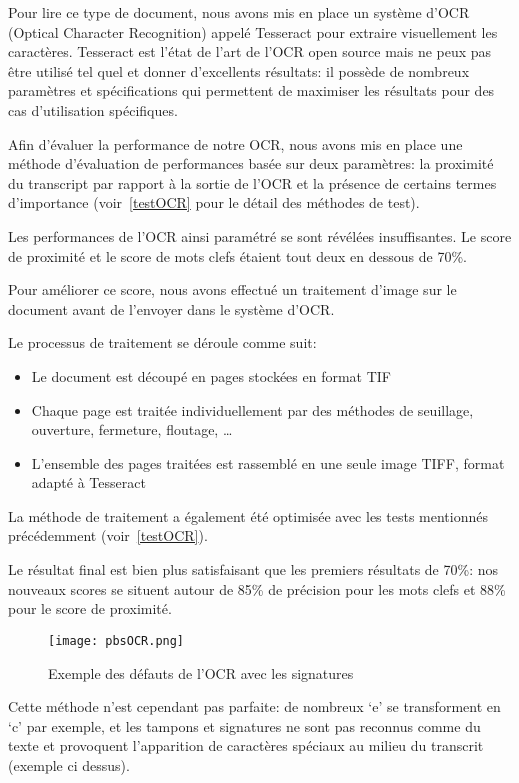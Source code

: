 Pour lire ce type de document, nous avons mis en place un système d'OCR (Optical Character Recognition) appelé Tesseract pour extraire visuellement les caractères.
Tesseract est l'état de l'art de l'OCR open source mais ne peux pas être utilisé tel quel et donner d'excellents résultats: il possède de nombreux paramètres et spécifications qui permettent de maximiser les résultats pour des cas d'utilisation spécifiques.

Afin d'évaluer la performance de notre OCR, nous avons mis en place une méthode d'évaluation de performances basée sur deux paramètres: la proximité du transcript par rapport à la sortie de l'OCR et la présence de certains termes d'importance (voir~\ref{testOCR} pour le détail des méthodes de test).

Les performances de l'OCR ainsi paramétré se sont révélées insuffisantes.
Le score de proximité et le score de mots clefs étaient tout deux en dessous de 70\%.


Pour améliorer ce score, nous avons effectué un traitement d'image sur le document avant de l'envoyer dans le système d'OCR\@.

Le processus de traitement se déroule comme suit:
\begin{itemize}
\item Le document est découpé en pages stockées en format TIF
\item Chaque page est traitée individuellement par des méthodes de seuillage, ouverture, fermeture, floutage, \ldots
\item L'ensemble des pages traitées est rassemblé en une seule image TIFF, format adapté à Tesseract
\end{itemize}

La méthode de traitement a également été optimisée avec les tests mentionnés précédemment (voir~\ref{testOCR}).

Le résultat final est bien plus satisfaisant que les premiers résultats de 70\%: nos nouveaux scores se situent autour de 85\% de précision pour les mots clefs et 88\% pour le score de proximité.

\begin{figure}[h!]
  \centering
  \texttt{[image: pbsOCR.png]}
	\caption[]{Exemple des défauts de l'OCR avec les signatures}
	\label{fig:defautsOCR}
\end{figure}

Cette méthode n'est cependant pas parfaite: de nombreux `e' se transforment en `c' par exemple, et les tampons et signatures ne sont pas reconnus comme du texte et provoquent l'apparition de caractères spéciaux au milieu du transcrit (exemple ci dessus).

